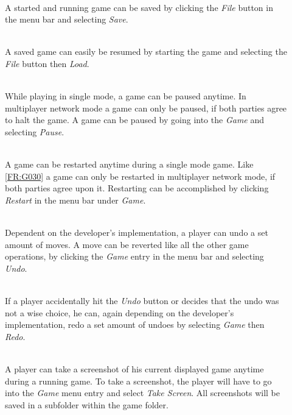\vspace{.5cm}

\begin{description}
  	\item[] \textbf{}  \\
  	A started and running game can be saved by clicking the \emph{File} button in the menu bar and selecting \emph{Save}.
 	\item[] \textbf{}  \\
 	A saved game can easily be resumed by starting the game and selecting the \emph{File} button then \emph{Load}.
	\item[] \textbf{}  \\
	While playing in single mode, a game can be paused anytime. In multiplayer network mode a game can only be paused, if both parties agree to halt the game. A game can be paused by going into the \emph{Game} and selecting \emph{Pause}.
	\item[] \textbf{}  \\
	A game can be restarted anytime during a single mode game. Like \ref{FR:G030} a game can only be restarted in multiplayer network mode, if both parties agree upon it. Restarting can be accomplished by clicking \emph{Restart} in the menu bar under \emph{Game}.
	\item[] \textbf{}  \\
	Dependent on the developer's implementation, a \gls{player} can undo a set amount of moves. A move can be reverted like all the other game operations, by clicking the \emph{Game} entry in the menu bar and selecting \emph{Undo}.
	\item[] \textbf{} \\
	If a player accidentally hit the \emph{Undo} button or decides that the undo was not a wise choice, he can, again depending on the developer's implementation, redo a set amount of undoes by selecting \emph{Game} then \emph{Redo}.
	\item[] \textbf{} \\
	A player can take a screenshot of his current displayed game anytime during a running game. To take a screenshot, the player will have to go into the \emph{Game} menu entry and select \emph{Take Screen}. All screenshots will be saved in a subfolder within the game folder.
\end{description}

